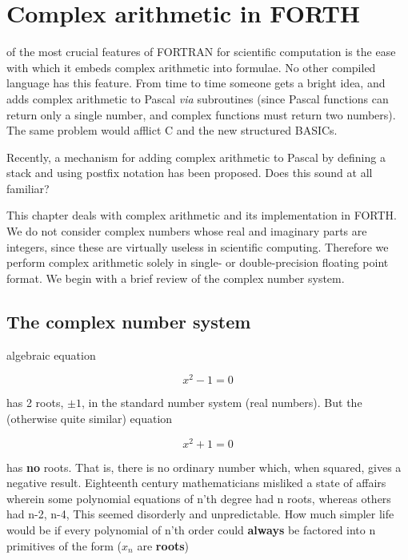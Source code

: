 
\chapter{Complex arithmetic in FORTH}

 of the most crucial features of FORTRAN for scientific computation is the ease with which it embeds complex arithmetic into formulae. No other compiled language has this feature. From time to time someone gets a bright idea, and adds complex arithmetic to Pascal \textit{via} subroutines (since Pascal functions can return only a single number, and complex functions must return two numbers). The same problem would afflict C and the new structured BASICs.

Recently, a mechanism for adding complex arithmetic to Pascal by defining a stack and using postfix notation has been proposed. Does this sound at all familiar?

This chapter deals with complex arithmetic and its implementation in FORTH. We do not consider complex numbers whose real and imaginary parts are integers, since these are virtually useless in scientific computing. Therefore we perform complex arithmetic solely in single- or double-precision floating point format. We begin with a brief review of the complex number system.

\section{The complex number system}
 algebraic equation

\begin{equation}
  x^2 - 1 = 0
\end{equation}

has 2 roots, $\pm1$, in the standard number system (real numbers). But the (otherwise quite similar) equation

\begin{equation}
  x^2 + 1 = 0
\end{equation}

has \textbf{no} roots. That is, there is no ordinary number which, when squared, gives a negative result. Eighteenth century mathematicians misliked a state of affairs wherein some polynomial equations of n'th degree had n roots, whereas others had n-2, n-4, \etc This seemed disorderly and unpredictable. How much simpler life would be if every polynomial of n'th order could \textbf{always} be factored into n primitives of the form ($x_n$ are \textbf{roots})

